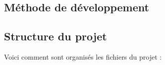 \documentclass[a4paper, 12pt, twoside]{article}
\begin{document}
    
    
    \tableofcontents
    \newpage
    
    \begin{indt}{\section{Méthode de développement}}%
        \begin{indt}{\subsection{Structure du projet}} %
            Voici comment sont organisés les fichiers du projet :
            \begin{figure}[H]%
                \centering
            

\end{figure}
\end{indt}
\end{indt}
\end{document}

